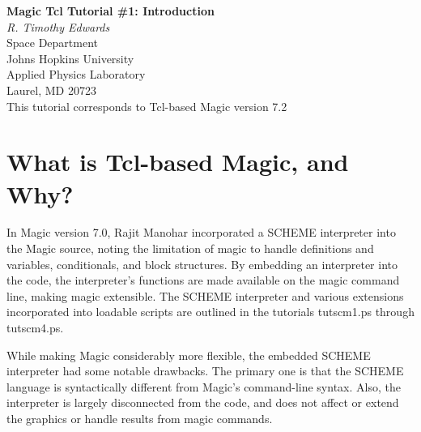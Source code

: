 \documentclass[letterpaper,twoside,12pt]{article}
\def\mytitle{Magic Tcl Tutorial \#1: Introduction}
\begin{document}
\makeatletter
\newcommand{\ps@magic}{%
	\renewcommand{\@oddhead}{\mytitle\hfil\today}%
	\renewcommand{\@evenhead}{\today\hfil\mytitle}%
	\renewcommand{\@evenfoot}{\hfil\textrm{--{\thepage}--}\hfil}%
	\renewcommand{\@oddfoot}{\@evenfoot}}
\newcommand{\ps@mplain}{%
	\renewcommand{\@oddhead}{}%
	\renewcommand{\@evenhead}{}%
	\renewcommand{\@evenfoot}{\hfil\textrm{--{\thepage}--}\hfil}%
	\renewcommand{\@oddfoot}{\@evenfoot}}
\makeatother
\pagestyle{magic}
\thispagestyle{mplain}


\begin{center}
  {\bfseries \Large \mytitle} \\
  \vspace*{0.5in}
  {\itshape R. Timothy Edwards} \\
  \vspace*{0.5in}
   Space Department \\
   Johns Hopkins University \\
   Applied Physics Laboratory \\
   Laurel, MD  20723 \\
  \vspace*{0.25in}
  This tutorial corresponds to Tcl-based Magic version 7.2 \\
\end{center}
\vspace*{0.5in}

\section{What is Tcl-based Magic, and Why?}

In Magic version 7.0, Rajit Manohar incorporated a SCHEME interpreter into
the Magic source, noting the limitation of magic to handle definitions
and variables, conditionals, and block structures.  By embedding an
interpreter into the code, the interpreter's functions are made available
on the magic command line, making magic extensible.  The SCHEME interpreter
and various extensions incorporated into loadable scripts are outlined
in the tutorials {\ttfamily tutscm1.ps} through {\ttfamily tutscm4.ps}.

While making Magic considerably more flexible, the embedded SCHEME
interpreter had some notable drawbacks.  The primary one is that the
SCHEME language is syntactically different from Magic's command-line
syntax.  Also, the interpreter is largely disconnected from the code,
and does not affect or extend the graphics or handle results from magic
commands.
\end{document}
